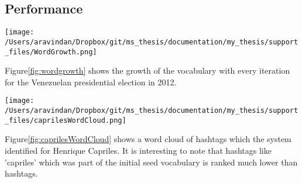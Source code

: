\subsection{Performance}
\begin{figure*}[Ht]
	\centering
	\texttt{[image: /Users/aravindan/Dropbox/git/ms\_thesis/documentation/my\_thesis/support\_files/WordGrowth.png]}
	\vspace{-1em}
	\caption{Word growth over time}
	\label{fig:wordgrowth}
	\vspace{-1em}
\end{figure*}	
Figure\ref{fig:wordgrowth} shows the growth of the vocabulary with every iteration for the Venezuelan presidential election in 2012.
\begin{figure*}[ht]
	\centering
	\texttt{[image: /Users/aravindan/Dropbox/git/ms\_thesis/documentation/my\_thesis/support\_files/caprilesWordCloud.png]}
	\vspace{-1em}
	\caption{Word cloud for Henrique Capriles}
	\label{fig:caprilesWordCloud}
	\vspace{-1em}
\end{figure*}

Figure\ref{fig:caprilesWordCloud} shows a word cloud of hashtags which the system identified for Henrique Capriles.
It is interesting to note that hashtags like 'capriles' which was part of the initial seed vocabulary is ranked much lower than hashtags. 


